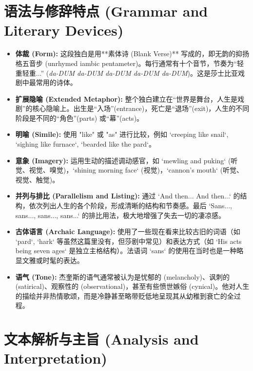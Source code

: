 \documentclass[12pt, a4paper]{article}
\begin{document}
\section{语法与修辞特点 (Grammar and Literary Devices)}

\begin{itemize}
    \item \textbf{体裁 (Form):} 这段独白是用**素体诗 (Blank Verse)** 写成的，即无韵的抑扬格五音步 (unrhymed iambic pentameter)。每行通常有十个音节，节奏为“轻重轻重...” (\textit{da-DUM da-DUM da-DUM da-DUM da-DUM})。这是莎士比亚戏剧中最常用的诗体。
    \item \textbf{扩展隐喻 (Extended Metaphor):} 整个独白建立在“世界是舞台，人生是戏剧”的核心隐喻上。出生是“入场”(entrance)，死亡是“退场”(exit)，人生的不同阶段是不同的“角色”(parts) 或“幕”(acts)。
    \item \textbf{明喻 (Simile):} 使用 "like" 或 "as" 进行比较，例如 `creeping like snail`, `sighing like furnace`, `bearded like the pard`。
    \item \textbf{意象 (Imagery):} 运用生动的描述调动感官，如 `mewling and puking` (听觉、视觉、嗅觉)，`shining morning face` (视觉)，`cannon's mouth` (听觉、视觉、触觉)。
    \item \textbf{并列与排比 (Parallelism and Listing):} 通过 `And then... And then...` 的结构，依次列出人生的各个阶段，形成清晰的结构和节奏感。最后 `Sans..., sans..., sans..., sans...` 的排比用法，极大地增强了失去一切的凄凉感。
    \item \textbf{古体语言 (Archaic Language):} 使用了一些现在看来比较古旧的词语（如 `pard`, `hark` 等虽然这篇里没有，但莎剧中常见）和表达方式（如 `His acts being seven ages` 是独立主格结构）。法语词 `sans` 的使用在当时也是一种略显文雅或时髦的表达。
    \item \textbf{语气 (Tone):} 杰奎斯的语气通常被认为是忧郁的 (melancholy)、讽刺的 (satirical)、观察性的 (observational)，甚至有些愤世嫉俗 (cynical)。他对人生的描绘并非热情歌颂，而是冷静甚至略带贬低地呈现其从幼稚到衰亡的全过程。
\end{itemize}

\section{文本解析与主旨 (Analysis and Interpretation)}
\end{document}
